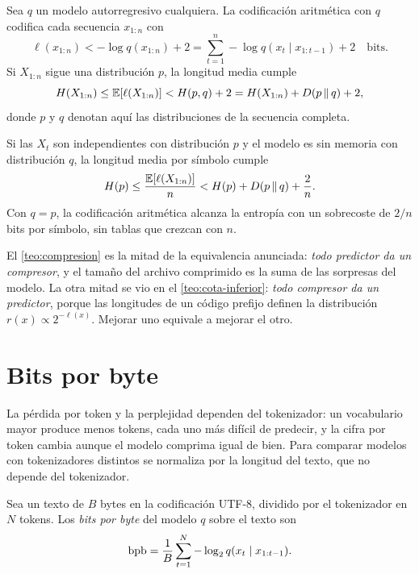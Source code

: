 \begin{teorema}\label{teo:compresion}
Sea $q$ un modelo autorregresivo cualquiera. La codificación aritmética con $q$ codifica cada secuencia $x_{1:n}$ con
\[
\ell(x_{1:n})<-\log q(x_{1:n})+2=\sum_{t=1}^{n}-\log q(x_t\mid x_{1:t-1})+2\quad\text{bits}.
\]
Si $X_{1:n}$ sigue una distribución $p$, la longitud media cumple
\[
H(X_{1:n})\le\mathbb{E}[\ell(X_{1:n})]<H(p,q)+2=H(X_{1:n})+D(p\,\|\,q)+2,
\]
donde $p$ y $q$ denotan aquí las distribuciones de la secuencia completa.
\end{teorema}

\begin{corolario}\label{cor:por-simbolo}
Si las $X_t$ son independientes con distribución $p$ y el modelo es sin memoria con distribución $q$, la longitud media por símbolo cumple
\[
H(p)\le\frac{\mathbb{E}[\ell(X_{1:n})]}{n}<H(p)+D(p\,\|\,q)+\frac{2}{n}.
\]
Con $q=p$, la codificación aritmética alcanza la entropía con un sobrecoste de $2/n$ bits por símbolo, sin tablas que crezcan con $n$.
\end{corolario}

El \cref{teo:compresion} es la mitad de la equivalencia anunciada: \emph{todo predictor da un compresor}, y el tamaño del archivo comprimido es la suma de las sorpresas del modelo. La otra mitad se vio en el \cref{teo:cota-inferior}: \emph{todo compresor da un predictor}, porque las longitudes de un código prefijo definen la distribución $r(x)\propto2^{-\ell(x)}$. Mejorar uno equivale a mejorar el otro.

\addtocounter{figure}{1}%

\addtocounter{definicion}{1}%

\section{Bits por byte}

La pérdida por token y la perplejidad dependen del tokenizador: un vocabulario mayor produce menos tokens, cada uno más difícil de predecir, y la cifra por token cambia aunque el modelo comprima igual de bien. Para comparar modelos con tokenizadores distintos se normaliza por la longitud del texto, que no depende del tokenizador.

\begin{definicion}\label{def:bpb}
Sea un texto de $B$ bytes en la codificación UTF-8, dividido por el tokenizador en $N$ tokens. Los \emph{bits por byte} del modelo $q$ sobre el texto son
\[
\operatorname{bpb}=\frac{1}{B}\sum_{t=1}^{N}-\log_2 q(x_t\mid x_{1:t-1}).
\]
\end{definicion}


